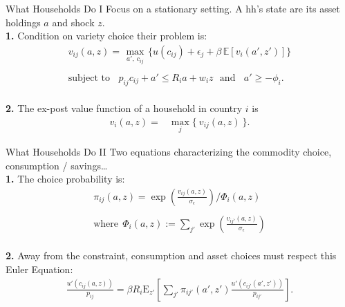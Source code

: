 \documentclass[9pt,pdftex,aspectratio=1610]{beamer}
\theoremstyle{definition}
\begin{document}

\begin{frame}[t]{What Households Do I}
\smallskip
Focus on a stationary setting. A hh's state are its asset holdings $a$ and shock $z$.\\
\bigskip
\textbf{1.} Condition on variety choice their problem is:
\begin{align}
v_{ij}(a, z) =   \max_{\ a', \ c_{ij}  \ }\bigg  \{ u(c_{ij}) + \epsilon_{j}  + \beta \, \mathbb{E} [v_{i}(a', z')]  \bigg\} \nonumber \\
\nonumber \\
\mbox{subject to}  \ \ \  \  p_{ij}c_{ij} +  a' \leq    R_{i} a + w_{i} z \ \ \  \mbox{and} \ \ \ \ a' \geq - \phi_{i}. \nonumber
\end{align}\\
\bigskip
\medskip
\textbf{2.} The ex-post value function of a household in country $i$ is
\begin{align}
v_{i}(a, z) = &  \max_{j} \big  \{ \  v_{ij}(a, z)  \ \big \}. \nonumber
\end{align}
\end{frame}


\begin{frame}[t]{What Households Do II}
\smallskip
Two equations characterizing the commodity choice, consumption / savings\ldots\\
\medskip
\textbf{1.} The choice probability is:
\begin{align*}
\pi_{ij}(a, z) = \exp \left( \frac{ v_{ij}(a, z) }{\sigma_{\epsilon}} \right) \Bigg / \Phi_{i}(a,z) \\
\\
\mbox{where} \ \ \Phi_{i}(a,z) := \sum_{j'} \exp \left( \frac{ v_{ij'}(a, z) }{\sigma_{\epsilon}} \right)
\end{align*}\\
\bigskip
\medskip
\textbf{2.} Away from the constraint, consumption and asset choices must respect this Euler Equation:
\begin{align*}
\frac{u'(c_{ij}(a, z))}{p_{ij}} = \beta R_{i} \mathrm{E}_{z'} \left[ \sum_{j'} \pi_{ij'}(a', z') \frac{u'(c_{ij'}(a', z'))}{p_{ij'}} \right].
\end{align*}
\end{frame}
\end{document}
